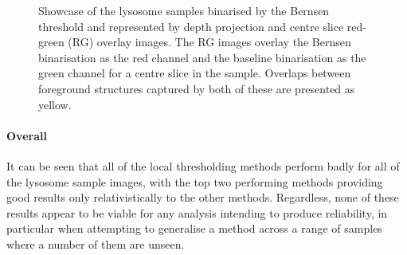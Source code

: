 \begin{figure}[h!]
	
	\caption[Showcase of the lysosome samples binarised by the Bernsen threshold and represented by depth projection and red-green overlay images.]{Showcase of the lysosome samples binarised by the Bernsen threshold and represented by depth projection and centre slice red-green (RG) overlay images. The RG images overlay the Bernsen binarisation as the red channel and the baseline binarisation as the green channel for a centre slice in the sample. Overlaps between foreground structures captured by both of these are presented as yellow.}
	\label{fig:lyso_bernsen}
\end{figure}

\paragraph{Overall} It can be seen that all of the local thresholding methods perform badly for all of the lysosome sample images, with the top two performing methods providing good results only relativistically to the other methods. Regardless, none of these results appear to be viable for any analysis intending to produce reliability, in particular when attempting to generalise a method across a range of samples where a number of them are unseen. 

